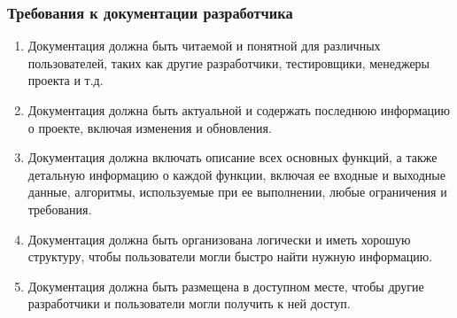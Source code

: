 \documentclass[14pt, a4paper]{extarticle}
\begin{document}
\subsubsection*{Требования к документации разработчика}

\begin{enumerate}
\item Документация должна быть читаемой и понятной для различных пользователей, таких как другие разработчики, тестировщики, менеджеры проекта и т.д.
\item Документация должна быть актуальной и содержать последнюю информацию о проекте, включая изменения и обновления.
\item Документация должна включать описание всех основных функций, а также детальную информацию о каждой функции, включая ее входные и выходные данные, алгоритмы, используемые при ее выполнении, любые ограничения и требования.
\item Документация должна быть организована логически и иметь хорошую структуру, чтобы пользователи могли быстро найти нужную информацию.
\item Документация должна быть размещена в доступном месте, чтобы другие разработчики и пользователи могли получить к ней доступ.
\end{enumerate}
\end{document}
